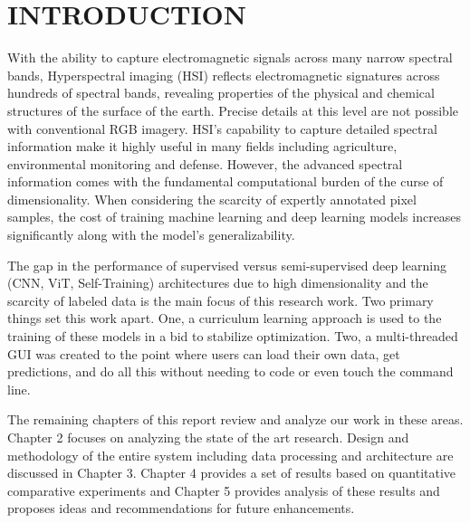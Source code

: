 \chapter{INTRODUCTION}
With the ability to capture electromagnetic signals across many narrow spectral bands, Hyperspectral imaging (HSI) reflects electromagnetic signatures across hundreds of spectral bands, revealing properties of the physical and chemical structures of the surface of the earth. Precise details at this level are not possible with conventional RGB imagery. HSI's capability to capture detailed spectral information make it highly useful in many fields including agriculture, environmental monitoring and defense. However, the advanced spectral information comes with the fundamental computational burden of the curse of dimensionality. When considering the scarcity of expertly annotated pixel samples, the cost of training machine learning and deep learning models increases significantly along with the model’s generalizability.

The gap in the performance of supervised versus semi-supervised deep learning (CNN, ViT, Self-Training) architectures due to high dimensionality and the scarcity of labeled data is the main focus of this research work. Two primary things set this work apart. One, a curriculum learning approach is used to the training of these models in a bid to stabilize optimization. Two, a multi-threaded GUI was created to the point where users can load their own data, get predictions, and do all this without needing to code or even touch the command line.

The remaining chapters of this report review and analyze our work in these areas. Chapter 2 focuses on analyzing the state of the art research. Design and methodology of the entire system including data processing and architecture are discussed in Chapter 3. Chapter 4 provides a set of results based on quantitative comparative experiments and Chapter 5 provides analysis of these results and proposes ideas and recommendations for future enhancements.

